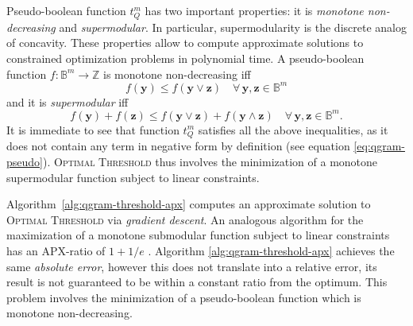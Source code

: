 Pseudo-boolean function $t_{Q}^{m}$ has two important properties: it is \emph{monotone non-decreasing} and \emph{supermodular}.
In particular, supermodularity is the discrete analog of concavity.
These properties allow to compute approximate solutions to constrained optimization problems in polynomial time.
A pseudo-boolean function $f : \mathbb{B}^m \rightarrow \mathbb{Z}$ is monotone non-decreasing iff 
\begin{equation}
\label{eq:monotone-non-decreasing}
f(\mathbf{y}) \leq f(\mathbf{y} \vee \mathbf{z}) \quad \forall \, \mathbf{y}, \mathbf{z} \in \mathbb{B}^m
\end{equation}
and it is \emph{supermodular} iff 
\begin{equation}
\label{eq:supermodularity}
f(\mathbf{y}) + f(\mathbf{z}) \leq f(\mathbf{y} \vee \mathbf{z}) + f(\mathbf{y} \wedge \mathbf{z}) \quad \forall \, \mathbf{y}, \mathbf{z} \in \mathbb{B}^m.
\end{equation}
It is immediate to see that function $t_{Q}^{m}$ satisfies all the above inequalities, as it does not contain any term in negative form by definition (see equation \ref{eq:qgram-pseudo}).
\textsc{Optimal Threshold} thus involves the minimization of a monotone supermodular function subject to linear constraints.

Algorithm~\ref{alg:qgram-threshold-apx} computes an approximate solution to \textsc{Optimal Threshold} via \emph{gradient descent}.
An analogous algorithm for the maximization of a monotone submodular function subject to linear constraints has an APX-ratio of $1 + 1/e$ \citep{Vazirani2001}.
Algorithm \ref{alg:qgram-threshold-apx} achieves the same \emph{absolute error}, however this does not translate into a relative error, \ie its result is not guaranteed to be within a constant ratio from the optimum.
This problem involves the minimization of a pseudo-boolean function which is monotone non-decreasing.


